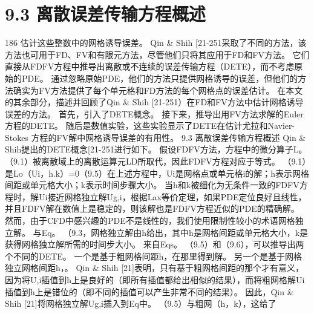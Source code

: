 \documentclass[UTF8,11pt,a4paper,openany,fontset=fandol]{ctexbook}
\begin{document}
\section{9.3 离散误差传输方程概述}
186 估计这些整数中的网格诱导误差。 Qin \& Shih [21-251采取了不同的方法，该方法也可用于FD、FV和有限元方法，尽管他们只将其应用于FD和FV方法。 它们直接从FDFV方程中推导出离散或不连续的误差传输方程（DETE），而不考虑原始的PDE。 通过忽略原始PDE，他们的方法只提供网格诱导的误差，但他们的方法确实为FV方法提供了每个单元格和FD方法的每个网格点的误差估计。 在本文的其余部分，描述并回顾了Qin \& Shih [21-251）在FD和FV方法中估计网格诱导误差的方法。 首先，引入了DETE概念。 接下来，推导出用FV方法求解的Euler 方程的DETE。 随后是数值实验，这些实验显示了DETE在估计尤拉和Navier-Stokes 方程的FV解中网格诱导误差的有用性。 9.3 离散误差传输方程概述 Qin \& Shih提出的DETE概念[21-251进行如下。 假设FDFV方法，方程中的微分算子L。 （9.1）被离散域上的离散运算元LD所取代，因此FDFV方程对应于等式。 （9.1）是Lo（Ui，h.k）=0（9.5）在上述方程中，Ui是网格点或单元格i的解；h表示网格间距或单元格大小；k表示时间步骤大小。 当h和k被细化为无条件一致的FDFV方程时，解Ui接近网格独立解Ug,i，根据Lax等价定理，如果PDE定位良好且线性，并且FDFV解在数值上是稳定的，则该解也是FDFV方程近似的PDE的精确解。 然而，由于CFD中感兴趣的PDE不是线性的，我们使用限制性较小的术语网格独立解。 与Eq。 （9.3，网格独立解由h给出，其中h是网格间距或单元格大小，k是获得网格独立解所需的时间步大小。 来自Eqs。 （9.5）和（9.6），可以推导出两个不同的DETE。 一个是基于粗网格间距h，在那里得到解。 另一个是基于网格独立网格间距h，。 Qin \& Shih [21]表明，只有基于粗网格间距的那个才有意义，因为将U,i插值到h上是良好的（即所有插值都给出相似的结果），而将粗网格解Ui插值到h上是错位的（即不同的插值可以产生非常不同的结果）。 因此，Qin \& Shih [21]将网格独立解Ug,i插入到Eq中。 （9.5）与粗网（h，k），这给了
\end{document}
